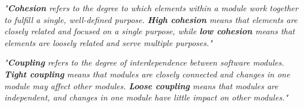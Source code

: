

\begin{center}
\textit{"\textbf{Cohesion} refers to the degree to which elements within a module work together to fulfill a single, well-defined purpose. \textbf{High cohesion} means that elements are closely related and focused on a single purpose, while \textbf{low cohesion} means that elements are loosely related and serve multiple purposes."} \cite{geeksforgeeks:c&c} \\
\end{center}

\begin{center}
\textit{"\textbf{Coupling} refers to the degree of interdependence between software modules. \textbf{Tight coupling} means that modules are closely connected and changes in one module may affect other modules. \textbf{Loose coupling} means that modules are independent, and changes in one module have little impact on other modules."} \cite{geeksforgeeks:c&c} \\
\end{center}


